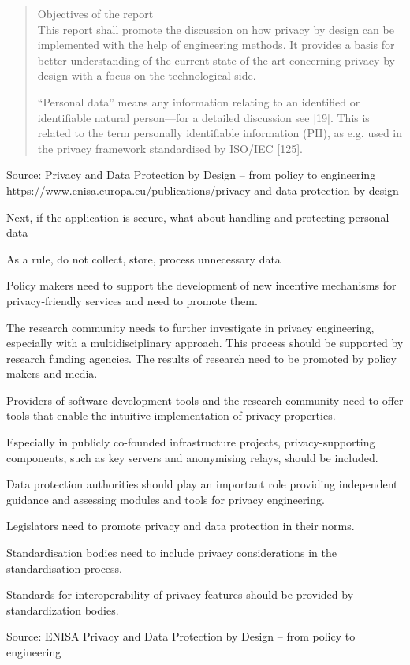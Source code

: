 \documentclass[Screen16to9,17pt]{foils}
\begin{document}
\begin{quote}
Objectives of the report\\
This report shall promote the discussion on how privacy by design can be implemented with the help
of engineering methods. It provides a basis for better understanding of the current state of the art
concerning privacy by design with a focus on the technological side.

“Personal data” means any information relating to an identified or identifiable natural person—for a
detailed discussion see [19]. This is related to the term personally identifiable information (PII), as e.g.
used in the privacy framework standardised by ISO/IEC [125].
\end{quote}
Source:
Privacy and Data Protection by Design
– from policy to engineering\\
{\footnotesize\url{https://www.enisa.europa.eu/publications/privacy-and-data-protection-by-design}}
\begin{list2}
\item Next, if the application is secure, what about handling and protecting personal data
\item As a rule, do not collect, store, process unnecessary data
\end{list2}


\begin{list2}
\item {\small Policy makers need to support the development of new incentive mechanisms for privacy-friendly services and need to promote them.}
\item {\small The research community needs to further investigate in privacy engineering, especially with a
multidisciplinary approach. This process should be supported by research funding agencies.
The results of research need to be promoted by policy makers and media.}
\item {\small Providers of software development tools and the research community need to offer tools that
enable the intuitive implementation of privacy properties.}
\item {\small Especially in publicly co-founded infrastructure projects, privacy-supporting components,
such as key servers and anonymising relays, should be included.}
\item {\small Data protection authorities should play an important role providing independent guidance
and assessing modules and tools for privacy engineering.}
\item {\small Legislators need to promote privacy and data protection in their norms.}
\item {\small Standardisation bodies need to include privacy considerations in the standardisation process.}
\item {\small Standards for interoperability of privacy features should be provided by standardization bodies.}
\end{list2}

Source:
ENISA Privacy and Data Protection by Design
– from policy to engineering




\slidenext{}
\end{document}
